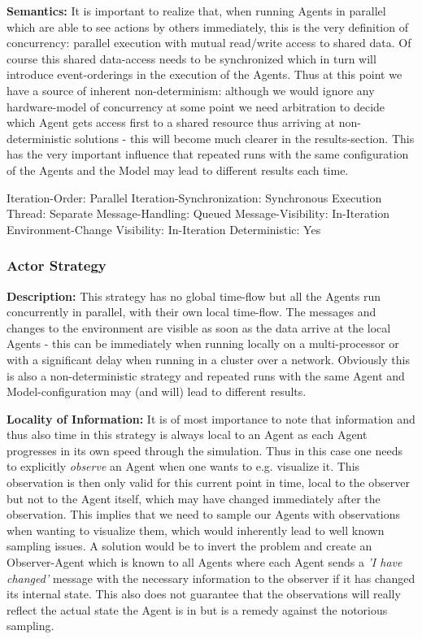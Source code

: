 \textbf{Semantics:} It is important to realize that, when running Agents in parallel which are able to see actions by others immediately, this is the very definition of concurrency: parallel execution with mutual read/write access to shared data. Of course this shared data-access needs to be synchronized which in turn will introduce event-orderings in the execution of the Agents. Thus at this point we have a source of inherent non-determinism: although we would ignore any hardware-model of concurrency at some point we need arbitration to decide which Agent gets access first to a shared resource thus arriving at non-deterministic solutions - this will become much clearer in the results-section. This has the very important influence that repeated runs with the same configuration of the Agents and the Model may lead to different results each time.

	Iteration-Order:			Parallel
	Iteration-Synchronization: 	Synchronous
	Execution Thread:			Separate
 	Message-Handling:			Queued
 	Message-Visibility:			In-Iteration
 	Environment-Change Visibility:		In-Iteration
 	Deterministic:				Yes

\subsubsection{Actor Strategy}
\textbf{Description:} This strategy has no global time-flow but all the Agents run concurrently in parallel, with their own local time-flow. The messages and changes to the environment are visible as soon as the data arrive at the local Agents - this can be immediately when running locally on a multi-processor or with a significant delay when running in a cluster over a network. Obviously this is also a non-deterministic strategy and repeated runs with the same Agent and Model-configuration may (and will) lead to different results.

\textbf{Locality of Information:} It is of most importance to note that information and thus also time in this strategy is always local to an Agent as each Agent progresses in its own speed through the simulation. Thus in this case one needs to explicitly \textit{observe} an Agent when one wants to e.g. visualize it. This observation is then only valid for this current point in time, local to the observer but not to the Agent itself, which may have changed immediately after the observation. This implies that we need to sample our Agents with observations when wanting to visualize them, which would inherently lead to well known sampling issues. A solution would be to invert the problem and create an Observer-Agent which is known to all Agents where each Agent sends a \textit{'I have changed'} message with the necessary information to the observer if it has changed its internal state. This also does not guarantee that the observations will really reflect the actual state the Agent is in but is a remedy against the notorious sampling. 

